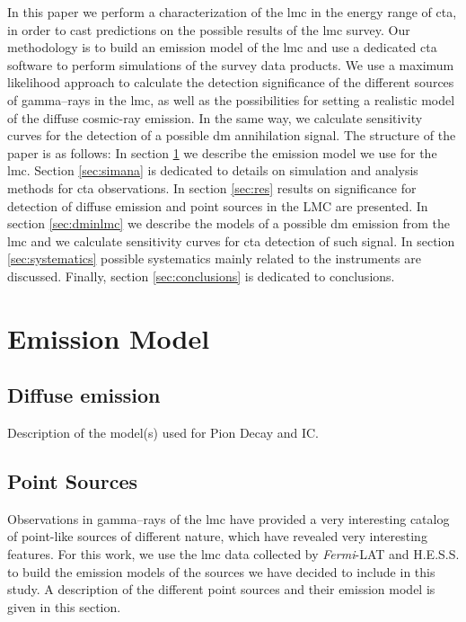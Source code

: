 \documentclass{article}
\begin{document}
In this paper we perform a characterization of the \gls{lmc} in the energy range of \gls{cta}, in order to cast predictions on the possible results of the \gls{lmc} survey. Our methodology is to build an emission model of the \gls{lmc} and use a dedicated \gls{cta} software to perform simulations of the survey data products. We use a maximum likelihood approach to calculate the detection significance of the different sources of gamma--rays in the \gls{lmc}, as well as the possibilities for setting a realistic model of the diffuse cosmic-ray emission. In the same way, we calculate sensitivity curves for the detection of a possible \gls{dm} annihilation signal. The structure of the paper is as follows:
In section \ref{sec:model} we describe the emission model we use for the \gls{lmc}. Section \ref{sec:simana} is dedicated to details on simulation and analysis methods for \gls{cta} observations. In section \ref{sec:res} results on significance for detection of diffuse emission and point sources in the LMC are presented. In section \ref{sec:dminlmc} we describe the models of a possible \gls{dm} emission from the \gls{lmc} and we calculate sensitivity curves for \gls{cta} detection of such signal. In section \ref{sec:systematics} possible systematics mainly related to the instruments are discussed. Finally, section \ref{sec:conclusions} is dedicated to conclusions.

\section{Emission Model} \label{sec:model}
     
    \subsection{Diffuse emission} \label{sec:diffusemodel}
    Description of the model(s) used for Pion Decay and IC.
    \subsection{Point Sources}
    
    Observations in gamma--rays of the \gls{lmc} have provided a very interesting catalog of point-like sources of different nature, which have revealed very interesting features. For this work, we use the \gls{lmc} data collected by \textit{Fermi}-LAT \cite{2010FermiLATLMC11months} \cite{2016LMCFermiLAT} and H.E.S.S. \cite{2012HESSLMC} \cite{2015HESSTeVLMC} \cite{2017HESSLMCP3} to build the emission models of the sources we have decided to include in this study. A description of the different point sources and their emission model is given in this section.
    
\end{document}
